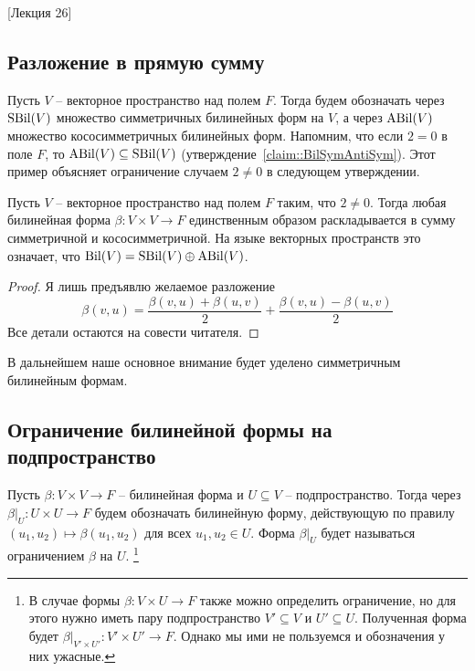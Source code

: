 [Лекция 26]


\subsection{Разложение в прямую сумму}

Пусть $V$ -- векторное пространство над полем $F$.
Тогда будем обозначать через $\operatorname{SBil}(V)$ множество симметричных билинейных форм на $V$, а через $\operatorname{ABil}(V)$ множество кососимметричных билинейных форм.
Напомним, что если $2 = 0$ в поле $F$, то $\operatorname{ABil}(V)\subseteq \operatorname{SBil}(V)$ (утверждение~\ref{claim::BilSymAntiSym}).
Этот пример объясняет ограничение случаем $2 \neq 0$ в следующем утверждении.

\begin{claim}
\label{claim::BilDirectSA}
Пусть $V$ -- векторное пространство над полем $F$ таким, что $2 \neq 0$.
Тогда любая билинейная форма $\beta\colon V\times V\to F$ единственным образом раскладывается в сумму симметричной и кососимметричной.
На языке векторных пространств это означает, что $\operatorname{Bil}(V) = \operatorname{SBil}(V) \oplus \operatorname{ABil}(V)$.
\end{claim}
\begin{proof}
Я лишь предъявлю желаемое разложение 
\[
\beta(v,u) = \frac{\beta(v,u) + \beta(u, v)}{2} + \frac{\beta(v,u) - \beta(u,v)}{2}
\]
Все детали остаются на совести читателя.
\end{proof}

В дальнейшем наше основное внимание будет уделено симметричным билинейным формам.


\subsection{Ограничение билинейной формы на подпространство}

\begin{definition}
Пусть $\beta\colon V\times V\to F$ -- билинейная форма и $U\subseteq V$ -- подпространство.
Тогда через $\beta|_U\colon U\times U\to F$ будем обозначать билинейную форму, действующую по правилу $(u_1, u_2)\mapsto \beta(u_1, u_2)$ для всех $u_1,u_2\in U$.
Форма $\beta|_U$ будет называться ограничением $\beta$ на $U$.%
\footnote{В случае формы $\beta\colon V\times U\to F$ также можно определить ограничение, но для этого нужно иметь пару подпространство $V'\subseteq V$ и $U'\subseteq U$.
Полученная форма будет $\beta|_{V'\times U'}\colon V'\times U' \to F$.
Однако мы ими не пользуемся и обозначения у них ужасные.}
\end{definition}

